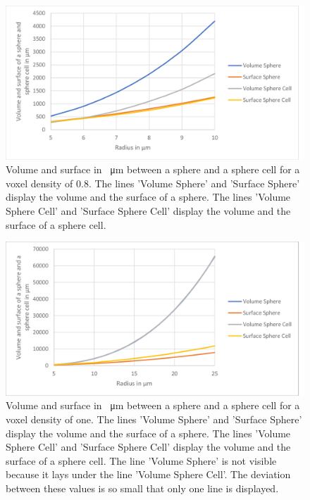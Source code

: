 \begin{figure}[H]
	\center
	\includegraphics[scale=0.3]{figures/DeviationSphereToPixelSphere-vD0_8.png}
	\caption[Volume and surface in \SI{}{\micro\metre} between a sphere and a sphere cell for a voxel density of 0.8]{Volume and surface in \SI{}{\micro\metre} between a sphere and a sphere cell for a voxel density of 0.8.  The lines 'Volume Sphere' and 'Surface Sphere' display the volume and the surface of a sphere. The lines 'Volume Sphere Cell' and 'Surface Sphere Cell' display the volume and the surface of a sphere cell.}
	\label{img:DeviationSphereCellRealSphere-vD0,8}
\end{figure}

\vspace{2cm}
\begin{figure}[h]
	\center
	\includegraphics[scale=0.3]{figures/DeviationSphereToPixelSphere-vD1.png}
	\caption[Volume and surface in \SI{}{\micro\metre} between a sphere and a sphere cell for a voxel density of one]{Volume and surface in \SI{}{\micro\metre} between a sphere and a sphere cell for a voxel density of one.  The lines 'Volume Sphere' and 'Surface Sphere' display the volume and the surface of a sphere. The lines 'Volume Sphere Cell' and 'Surface Sphere Cell' display the volume and the surface of a sphere cell. The line 'Volume Sphere' is not visible because it lays under the line 'Volume Sphere Cell'. The deviation between these values is so small that only one line is displayed.}
	\label{img:DeviationSphereCellRealSphere-vD1}
\end{figure}

